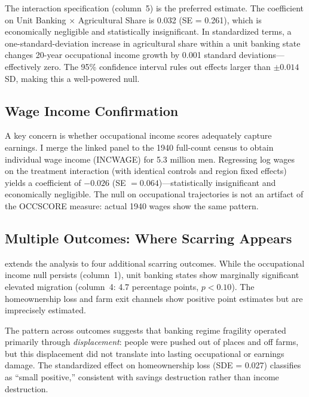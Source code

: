 \documentclass[12pt]{article}
\begin{document}
The interaction specification (column~5) is the preferred estimate. The coefficient on Unit Banking $\times$ Agricultural Share is 0.032 (SE = 0.261), which is economically negligible and statistically insignificant. In standardized terms, a one-standard-deviation increase in agricultural share within a unit banking state changes 20-year occupational income growth by 0.001 standard deviations---effectively zero. The 95\% confidence interval rules out effects larger than $\pm 0.014$ SD, making this a well-powered null.



\subsection{Wage Income Confirmation}

A key concern is whether occupational income scores adequately capture earnings. I merge the linked panel to the 1940 full-count census to obtain individual wage income (INCWAGE) for 5.3 million men. Regressing log wages on the treatment interaction (with identical controls and region fixed effects) yields a coefficient of $-0.026$ (SE $= 0.064$)---statistically insignificant and economically negligible. The null on occupational trajectories is not an artifact of the OCCSCORE measure: actual 1940 wages show the same pattern.

\subsection{Multiple Outcomes: Where Scarring Appears}

 extends the analysis to four additional scarring outcomes. While the occupational income null persists (column~1), unit banking states show marginally significant elevated migration (column~4: 4.7 percentage points, $p < 0.10$). The homeownership loss and farm exit channels show positive point estimates but are imprecisely estimated.

The pattern across outcomes suggests that banking regime fragility operated primarily through \textit{displacement}: people were pushed out of places and off farms, but this displacement did not translate into lasting occupational or earnings damage. The standardized effect on homeownership loss (SDE = 0.027) classifies as ``small positive,'' consistent with savings destruction rather than income destruction.


\end{document}
